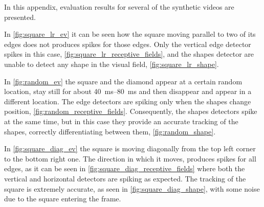 In this appendix, evaluation results for several of the synthetic videos are presented. 

In \cref{fig:square_lr_ev} it can be seen how the square moving parallel to two of its edges does not produces spikes for those edges. Only the vertical edge detector spikes in this case, \cref{fig:square_lr_receptive_fields}, and the shapes detector are unable to detect any shape in the visual field, \cref{fig:square_lr_shape}.

In \cref{fig:random_ev} the square and the diamond appear at a certain random location, stay still for about \SIrange{40}{80}{\milli\second} and then disappear and appear in a different location. The edge detectors are spiking only when the shapes change position, \cref{fig:random_receptive_fields}. Consequently, the shapes detectors spike at the same time, but in this case they provide an accurate tracking of the shapes, correctly differentiating between them, \cref{fig:random_shape}.

In \cref{fig:square_diag_ev} the square is moving diagonally from the top left corner to the bottom right one. The direction in which it moves, produces spikes for all edges, as it can be seen in \cref{fig:square_diag_receptive_fields} where both the vertical and horizontal detectors are spiking as expected. The tracking of the square is extremely accurate, as seen in \cref{fig:square_diag_shape}, with some noise due to the square entering the frame. 

